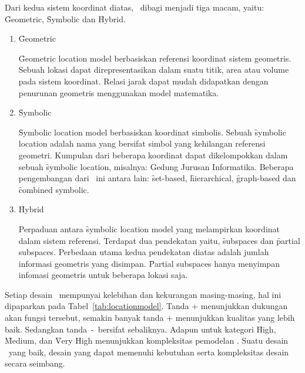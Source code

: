 Dari kedua sistem koordinat diatas, \locationmodel~dibagi menjadi tiga macam, yaitu:
\f{Geometric}, \f{Symbolic} dan \f{Hybrid}.

\begin{enumerate}[noitemsep,nolistsep,leftmargin=0cm,itemindent=.5cm,listparindent=\parindent]
    \item \f{Geometric}

\f{Geometric location model} berbasiskan referensi koordinat sistem geometris.
Sebuah lokasi dapat direpresentasikan dalam suatu titik, area atau volume pada
sistem koordinat.  Relasi jarak dapat mudah didapatkan dengan penurunan
geometris menggunakan model matematika.

    \item \f{Symbolic}

\f{Symbolic location model} berbasiskan koordinat simbolis. Sebuah \f{symbolic
location} adalah nama yang bersifat simbol yang kehilangan referensi geometri.
Kumpulan dari beberapa koordinat dapat dikelompokkan dalam sebuah \f{symbolic
location}, misalnya: Gedung Jurusan Informatika. Beberapa pengembangan dari
\locationmodel~ini antara lain: \f{set-based}, \f{hierarchical},
\f{graph-based} dan \f{combined symbolic}.

    \item \f{Hybrid}

Perpaduan antara \f{symbolic location model} yang melampirkan koordinat dalam
sistem referensi. Terdapat dua pendekatan yaitu, \f{subspaces} dan \f{partial
subspaces}.  Perbedaan utama kedua pendekatan diatas adalah jumlah informasi
geometris yang disimpan.  \f{Partial subspaces} hanya menyimpan infomasi
geometris untuk beberapa lokasi saja.

\end{enumerate}

Setiap desain \locationmodel~mempunyai kelebihan dan kekurangan masing-masing,
hal ini dipaparkan pada Tabel~\ref{tab:locationmodel}. Tanda + menunjukkan
dukungan akan fungsi tersebut, semakin banyak tanda + menunjukkan kualitas yang
lebih baik.  Sedangkan tanda~-~bersifat sebaliknya. Adapun untuk kategori
\f{High}, \f{Medium}, dan \f{Very High} menunjukkan kompleksitas pemodelan
\locationmodel. Suatu desain \locationmodel~yang baik, desain yang dapat
memenuhi kebutuhan serta kompleksitas desain secara seimbang.

